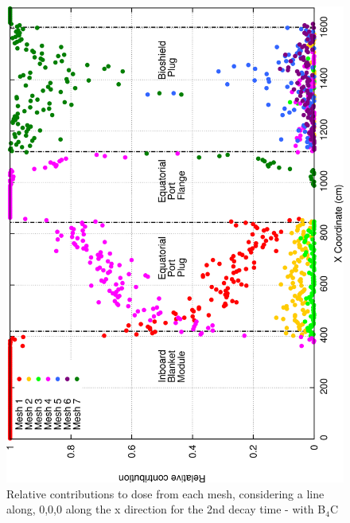 \documentclass[12pt]{article}
\begin{document}
\begin{figure}[ht!]
\centering
\includegraphics[clip,scale=0.25]{../plots/crosstalk/b4c/ep/dc2_rel.png}
\caption{Relative contributions to dose from each mesh, considering a line along, 
         0,0,0 along the x direction for the 2nd decay time - with B$_4$C }
\label{fig:b4c_ct_ep_dc2_rel}
\end{figure}

\newpage
\clearpage

\newpage
\clearpage
\end{document}
